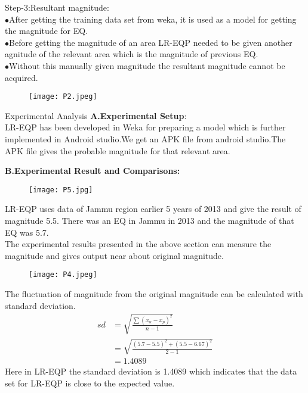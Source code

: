 \documentclass{beamer}
\begin{document}
 \begin{frame}{}
 Step-3:Resultant magnitude:\\
 $\bullet$After getting the training data set from weka, it is used as a model for getting the magnitude for EQ.\\
 $\bullet$Before getting the magnitude of an area LR-EQP needed to be given another agnitude of the relevant area which is the magnitude of previous EQ.\\
 $\bullet$Without this manually given magnitude the resultant magnitude cannot be acquired.\\
 
\end{frame}
\begin{frame}{}
   \begin{figure}[h]
    \centering
    \texttt{[image: P2.jpeg]}
\end{figure}  
\end{frame}
\begin{frame}{Experimental Analysis}
\textbf{A.Experimental Setup}:\\
LR-EQP has been developed in Weka for preparing a model which is further implemented in Android studio.We get an APK file from android studio.The APK file gives the probable magnitude for that relevant area.\\
\end{frame}
\begin{frame}{}
  \textbf{B.Experimental Result and Comparisons:}\\
  \begin{figure}[h]
    \centering
    \texttt{[image: P5.jpg]}
\end{figure}  
\end{frame}
\begin{frame}{}
LR-EQP uses data of Jammu region earlier 5 years of 2013 and give the result of magnitude 5.5. There was an EQ in Jammu in 2013 and the magnitude of that EQ was 5.7.\\
The experimental results presented in the above section can measure the magnitude and gives output near about original magnitude.\\
 \begin{figure}[h]
    \centering
    \texttt{[image: P4.jpeg]}
\end{figure}

\end{frame}
\begin{frame}{}
  The fluctuation of magnitude from the original magnitude can be calculated with standard deviation.\\
\begin{align}
sd &=\sqrt{\frac{\sum(x_{\alpha}-x_{p})^{2}}{n-1}}\\
   &=\sqrt{\frac{(5.7-5.5)^{2}+(5.5-6.67)^{2}}{2-1}}\\
   &=1.4089
\end{align}
Here in LR-EQP the standard deviation is 1.4089 which indicates that the data set for LR-EQP is close to the expected value. 
\end{frame}
\end{document}
